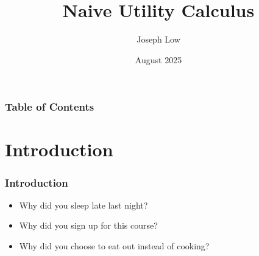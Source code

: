 \documentclass{beamer}
\title{Naive Utility Calculus}
\author{Joseph Low}
\date{August 2025}
\begin{document}
\frame{\titlepage}

\begin{frame}
\frametitle{Table of Contents}
\tableofcontents
\end{frame}

\section{Introduction}
\begin{frame}
\frametitle{Introduction}
\vfill
\begin{center}
\end{center}
\vfill

\pause

\begin{itemize}
    \item<2-> Why did you sleep late last night?
    \pause
    \item<3-> Why did you sign up for this course?
    \pause
    \item<4-> Why did you choose to eat out instead of cooking?
\end{itemize}
\end{frame}
\end{document}
